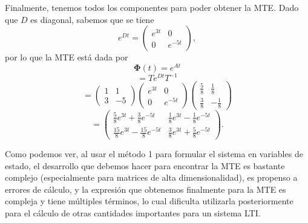 \documentclass[
  11pt,
  letterpaper,
   addpoints,
   answers
  ]{exam}
\begin{document}
\begin{questions}
\begin{solution}
Finalmente, tenemos todos los componentes para poder obtener la MTE. Dado que $D$ es diagonal,
sabemos que se tiene
\begin{equation}
e^{Dt}=\begin{pmatrix}
e^{3t} & 0\\
0 & e^{-5t}
\end{pmatrix},
\end{equation}
por lo que la MTE está dada por
\begin{equation}
\boldsymbol{\Phi}(t)=e^{At}
\end{equation}
\begin{equation}
=Te^{Dt}T^{-1}
\end{equation}
\begin{equation}
=\begin{pmatrix}
1 & 1\\
3 & -5
\end{pmatrix}
\begin{pmatrix}
e^{3t} & 0\\
0 & e^{-5t}
\end{pmatrix}
\begin{pmatrix}
\frac{5}{8} & \frac{1}{8}\\[4pt]
\frac{3}{8} & -\frac{1}{8}
\end{pmatrix}
\end{equation}
\begin{equation}
=\begin{pmatrix}
\frac{5}{8}e^{3t}+\frac{3}{8}e^{-5t} &
\frac{1}{8}e^{3t}-\frac{1}{8}e^{-5t}\\[4pt]
\frac{15}{8}e^{3t}-\frac{15}{8}e^{-5t} &
\frac{3}{8}e^{3t}+\frac{5}{8}e^{-5t}
\end{pmatrix}.
\end{equation}

Como podemos ver, al usar el método 1 para formular el sistema en variables de estado, el desarrollo
que debemos hacer para encontrar la MTE es bastante complejo (especialmente para matrices
de alta dimensionalidad), es propenso a errores de cálculo, y la expresión que obtenemos finalmente
para la MTE es compleja y tiene múltiples términos, lo cual dificulta utilizarla posteriormente para
el cálculo de otras cantidades importantes para un sistema LTI.


\end{solution}
\end{questions}
\end{document}
